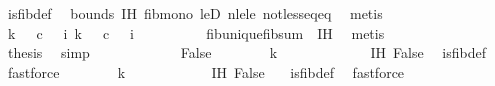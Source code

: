 \begin{isabellebody}
\ is{\isacharunderscore}{\kern0pt}fib{\isacharunderscore}{\kern0pt}def\ \isamarkupfalse%
\ bounds\ IH{\isacharparenleft}{\kern0pt}{}{\isacharminus}{\kern0pt}{}{\isacharparenright}{\kern0pt}\ fib{\isacharunderscore}{\kern0pt}mono\ leD\ nle{\isacharunderscore}{\kern0pt}le\ not{\isacharunderscore}{\kern0pt}less{\isacharunderscore}{\kern0pt}eq{\isacharunderscore}{\kern0pt}eq\ \isamarkupfalse%
\ metis\isanewline
\ \ \ \ \ \ \isamarkupfalse%
\ {\isachardoublequoteopen}k\ {\isacharequal}{\kern0pt}\ {}{\isachardoublequoteclose}\ {\isachardoublequoteopen}c\ {}\ {\isacharequal}{\kern0pt}\ i{\isachardoublequoteclose}\ {\isachardoublequoteopen}k{\isacharprime}{\kern0pt}\ {\isacharequal}{\kern0pt}\ {}{\isachardoublequoteclose}\ {\isachardoublequoteopen}c{\isacharprime}{\kern0pt}\ {}\ {\isacharequal}{\kern0pt}\ i{\isachardoublequoteclose}\isanewline
\ \ \ \ \ \ \ \ \isamarkupfalse%
\ fib{\isacharunderscore}{\kern0pt}unique{\isacharunderscore}{\kern0pt}fib{\isacharunderscore}{\kern0pt}sum\ {}\ IH{\isacharparenleft}{\kern0pt}{}{\isacharminus}{\kern0pt}{}{\isacharparenright}{\kern0pt}\ \isamarkupfalse%
\ metis{\isacharplus}{\kern0pt}\isanewline
\ \ \ \ \ \ \ \ \isamarkupfalse%
\ \isamarkupfalse%
\ {\isacharquery}{\kern0pt}thesis\ \isamarkupfalse%
\ simp\isanewline
\ \ \ \ \isamarkupfalse%
\isanewline
\ \ \ \ \ \ \isamarkupfalse%
\ False\isanewline
\ \ \ \ \ \ \isamarkupfalse%
\ {\isachardoublequoteopen}k\ {\isachargreater}{\kern0pt}\ {}{\isachardoublequoteclose}\ \isanewline
\ \ \ \ \ \ \ \ \isamarkupfalse%
\ IH{\isacharparenleft}{\kern0pt}{}{\isacharparenright}{\kern0pt}\ False\ \isamarkupfalse%
\ is{\isacharunderscore}{\kern0pt}fib{\isacharunderscore}{\kern0pt}def\ \isamarkupfalse%
\ fastforce\isanewline
\ \ \ \ \ \ \isamarkupfalse%
\ {\isachardoublequoteopen}k{\isacharprime}{\kern0pt}\ {\isachargreater}{\kern0pt}\ {}{\isachardoublequoteclose}\isanewline
\ \ \ \ \ \ \ \ \isamarkupfalse%
\ IH{\isacharparenleft}{\kern0pt}{}{\isacharparenright}{\kern0pt}\ False\ \ \isamarkupfalse%
\ is{\isacharunderscore}{\kern0pt}fib{\isacharunderscore}{\kern0pt}def\ \isamarkupfalse%
\ fastforce\isanewline
\ \ \ \ \ \ \isamarkupfalse%

\end{isabellebody}
